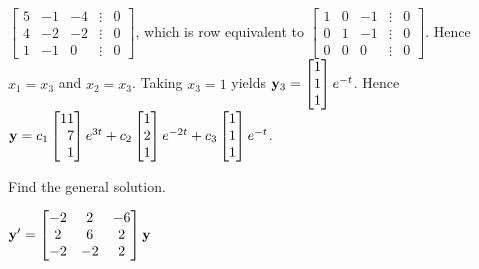 \documentclass{ximera}
\begin{document}
\begin{problem}
\begin{solution}
$  \begin{bmatrix}5&-1&-4&\vdots&0\\4&-2
&-2&\vdots&0\\1&-1&0&\vdots&0
 \end{bmatrix}$,
which is row equivalent to
$  \begin{bmatrix}1&0&-1&\vdots&0\\0&1&-1&
\vdots&0\\0&0&0&\vdots&0 \end{bmatrix}$.
Hence  $x_1=x_3$ and $x_2=x_3$.  Taking $x_3=1$ yields
${\bf y}_3=  \begin{bmatrix}1\\1\\1
 \end{bmatrix}e^{-t}$. Hence
 ${\bf y}= c_1 \begin{bmatrix}11\\\phantom{1}7
\\\phantom{1}1 \end{bmatrix}e^{3t}+c_2 \begin{bmatrix}1\\2
\\1 \end{bmatrix}e^{-2t}+c_3 \begin{bmatrix}1\\1\\1
 \end{bmatrix}e^{-t}$.
\end{solution}
\end{problem}


\begin{problem}\label{exer:10.4.13} 
Find the general solution.

$ {\bf y}'=
\begin{bmatrix}-2&2&-6\\2&6&2\\-2&-2&
2\end{bmatrix}{\bf y}$
\end{problem}
\end{document}
